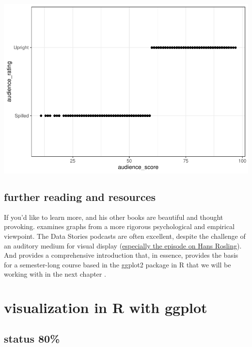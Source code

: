 \documentclass[
  openany]{book}
\begin{document}
\includegraphics{DataSciLibArts_files/figure-latex/unnamed-chunk-3-1.pdf}

\hypertarget{further-reading-and-resources}{%
\section{further reading and resources}\label{further-reading-and-resources}}

If you'd like to learn more, \citet{tufte2001visual} and his other books are beautiful and thought provoking. \citet{cleveland1985graphical} examines graphs from a more rigorous psychological and empirical viewpoint. The Data Stories podcasts are often excellent, despite the challenge of an auditory medium for visual display (\href{http://datastori.es/92-a-tribute-to-hans-rosling/}{especially the episode on Hans Rosling}). And \citet{healy2018viz} provides a comprehensive introduction that, in essence, provides the basis for a semester-long course based in the ggplot2 package in R that we will be working with in the next chapter \citep{wickham2016r}.

\hypertarget{visualization-in-r-with-ggplot}{%
\chapter{visualization in R with ggplot}\label{visualization-in-r-with-ggplot}}

\hypertarget{status-80}{%
\section*{status 80\%}\label{status-80}}
\end{document}
